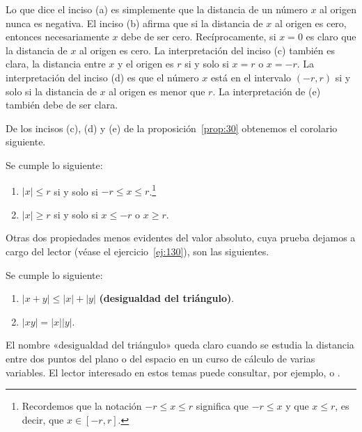 \documentclass[12pt,a4paper]{book}
\begin{document}
    Lo que dice el inciso (a) es simplemente que la distancia de un número $x$
    al origen nunca es negativa. El inciso (b) afirma que si la distancia de $x$ al
    origen es cero, entonces necesariamente $x$ debe de ser cero. Recíprocamente,
    si $x=0$ es claro que la distancia de $x$ al origen es cero. La interpretación del
    inciso (c) también es clara, la distancia entre $x$ y el origen es $r$ si y solo si
    $x=r$ o $x=-r$. La interpretación del inciso (d) es que el número $x$ está en
    el intervalo $(-r,r)$ si y solo si la distancia de $x$ al origen es menor que $r$. La
    interpretación de (e) también debe de ser clara.

    De los incisos (c), (d) y (e) de la proposición~\ref{prop:30} obtenemos el corolario
    siguiente.

    \begin{corolario}\label{cor:1}
        Se cumple lo siguiente:
        \begin{enumerate}[nosep]
            \item $|x|\leq r$ si y solo si $-r\leq x\leq r$.\footnote{Recordemos que la notación $-r\leq x\leq r$ significa que $-r\leq x$ y que $x\leq r$, es decir, que
            $x\in[-r,r]$.}
            \item $|x|\geq r$ si y solo si $x\leq -r$ o $x\geq r$.
        \end{enumerate}
    \end{corolario}

    Otras dos propiedades menos evidentes del valor absoluto, cuya prueba
    dejamos a cargo del lector (véase el ejercicio~\ref{ej:130}), son las siguientes.

    \begin{proposicion}\label{prop:31}
        Se cumple lo siguiente:
        \begin{enumerate}[nosep]
            \item $|x+y|\leq|x|+|y|$ \textbf{(desigualdad del triángulo)}.
            \item $|xy|=|x||y|$.
        \end{enumerate}
    \end{proposicion}

    El nombre «desigualdad del triángulo» queda claro cuando se estudia la
    distancia entre dos puntos del plano o del espacio en un curso de cálculo
    de varias variables. El lector interesado en estos temas puede consultar, por
    ejemplo, \cite{apostol1974} o \cite{nunez2020calculoIII}.
\end{document}
